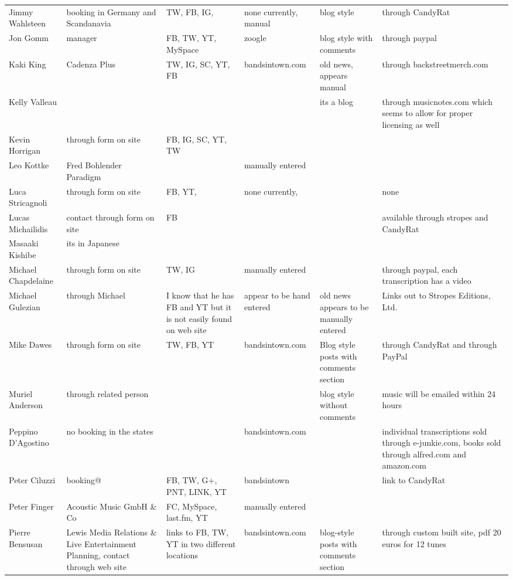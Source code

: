 \documentclass[unicode,hyperfootnotes=false,xetex,colorlinks=true,nofonts,nobib]{tufte-handout}
\begin{document}
\begin{longtable}{p{} p{} p{} p{} p{} p{}}
  Jimmy Wahlsteen & booking in Germany and Scandanavia & TW, FB, IG,  & none currently, manual & blog style & through CandyRat\\
  Jon Gomm & manager & FB, TW, YT, MySpace & zoogle & blog style with comments & through paypal\\
  Kaki King & Cadenza Plus & TW, IG, SC, YT, FB & bandsintown.com & old news, appears manual & through backstreetmerch.com\\
  Kelly Valleau &  &  &  & its a blog & through musicnotes.com which seems to allow for proper licensing as well\\
  Kevin Horrigan & through form on site & FB, IG, SC, YT, TW &  &  & \\
  Leo Kottke & Fred Bohlender Paradigm &  & manually entered &  & \\
  Luca Stricagnoli & through form on site & FB, YT, & none currently, &  & none\\
  Lucas Michailidis & contact through form on site & FB &  &  & available through stropes and CandyRat\\
  Masaaki Kishibe & its in Japanese &  &  &  & \\
  Michael Chapdelaine & through form on site & TW, IG & manually entered &  & through paypal, each transcription has a video\\
  Michael Gulezian & through Michael & I know that he has FB and YT but it is not easily found on web site & appear to be hand entered & old news appears to be manually entered & Links out to Stropes Editions, Ltd.\\
  Mike Dawes & through form on site & TW, FB, YT & bandsintown.com & Blog style posts with comments section & through CandyRat and through PayPal\\
  Muriel Anderson & through related person &  &  & blog style without comments & music will be emailed within 24 hours\\
  Peppino D’Agostino & no booking in the states &  & bandsintown.com &  & individual transcriptions sold through e-junkie.com, books sold through alfred.com and amazon.com\\
  Peter Ciluzzi & booking@ & FB, TW, G+, PNT, LINK, YT & bandsintown &  & link to CandyRat\\
  Peter Finger & Acoustic Music GmbH \& Co & FC, MySpace, last.fm, YT & manually entered & & \\
  Pierre Bensusan & Lewis Media Relations \& Live Entertainment Planning, contact through web site & links to FB, TW, YT in two different locations & bandsintown.com & blog-style posts with comments section & through custom built site, pdf 20 euros for 12 tunes\\

\end{longtable}
\end{document}
